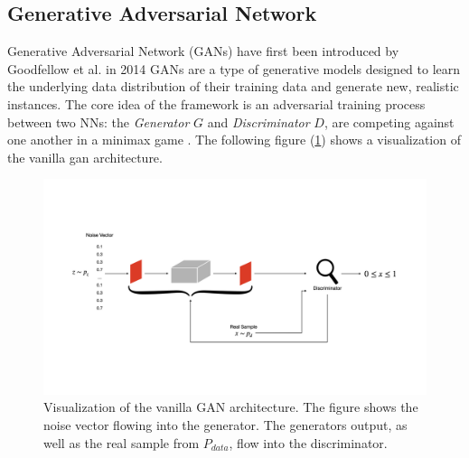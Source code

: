 



\subsection[Generative Adversarial Network - GAN]{Generative Adversarial Network}\label{theoretical_gan}
Generative Adversarial Network (GANs) have first been introduced by Goodfellow et al. in 2014 \cite{goodfellow2014generativeadversarialnetworks} GANs are a type of generative models designed to learn the underlying data distribution of their training data and generate new, realistic instances. The core idea of the framework is an adversarial training process between two NNs: the \textit{Generator} \(G\) and \textit{Discriminator} \(D\), are competing against one another in a minimax game \cite{VonNeumann1928Minimax}. The following figure (\ref{fig:figure_gan_arch}) shows a visualization of the vanilla gan architecture.

\begin{figure}[htbp]
    \centering
    \vspace{-4em}
    \includegraphics[width=.9\textwidth]{abb/arch_gan.png}
    \caption{Visualization of the vanilla GAN architecture. The figure shows the noise vector flowing into the generator. The generators output, as well as the real sample from \(P_{data}\), flow into the discriminator.}
    \label{fig:figure_gan_arch}
\end{figure}


